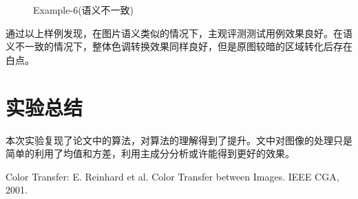 \documentclass[12pt]{article}
\begin{document}
	\begin{figure}[H]
		\centering
		\centering
		\caption{Example-6(语义不一致)}
	\end{figure}
	通过以上样例发现，在图片语义类似的情况下，主观评测测试用例效果良好。在语义不一致的情况下，整体色调转换效果同样良好，但是原图较暗的区域转化后存在白点。
	
	\section{实验总结}
	本次实验复现了论文中的算法，对算法的理解得到了提升。文中对图像的处理只是简单的利用了均值和方差，利用主成分分析或许能得到更好的效果。
	
	\begin{thebibliography}{99}
		 Color Transfer: E. Reinhard et al. Color Transfer between Images. IEEE CGA, 2001.
	\end{thebibliography}
\end{document}
